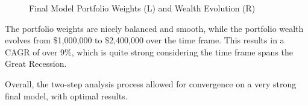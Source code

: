 \documentclass[10pt]{article}
\begin{document}
\begin{figure}[H]
    \centering
    \qquad
    \caption{Final Model Portfolio Weights (L) and Wealth Evolution (R)}
\end{figure}


The portfolio weights are nicely balanced and smooth, while the portfolio wealth evolves from \$1,000,000 to \$2,400,000 over the time frame. This results in a CAGR of over 9\%, which is quite strong considering the time frame spans the Great Recession.\bigskip

Overall, the two-step analysis process allowed for convergence on a very strong final model, with optimal results. 
\end{document}
